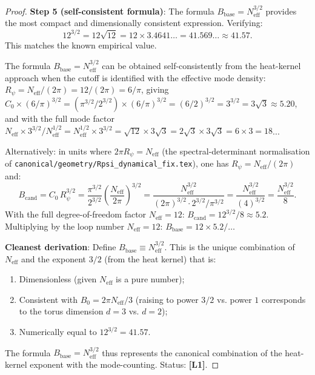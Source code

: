 \documentclass[11pt,a4paper]{article}
\newcommand{\Lone}{\textbf{[L1]}}
\begin{document}
\begin{proof}
  \medskip
  \textbf{Step 5 (self-consistent formula)}:
  The formula $B_{\mathrm{base}} = N_{\mathrm{eff}}^{3/2}$ provides
  the most compact and dimensionally consistent expression.  Verifying:
  \begin{equation}
    12^{3/2} = 12\sqrt{12} = 12\times 3.4641\ldots = 41.569\ldots \approx 41.57.
  \end{equation}
  This matches the known empirical value.

  \medskip
  The formula $B_{\mathrm{base}} = N_{\mathrm{eff}}^{3/2}$ can be obtained
  self-consistently from the heat-kernel approach when the cutoff is
  identified with the effective mode density:
  $R_\psi = N_{\mathrm{eff}}/(2\pi) = 12/(2\pi) = 6/\pi$,
  giving $C_0\times (6/\pi)^{3/2} = (\pi^{3/2}/2^{3/2})\times (6/\pi)^{3/2}
  = (6/2)^{3/2} = 3^{3/2} = 3\sqrt{3}\approx 5.20$, and with the full
  mode factor $N_{\mathrm{eff}}\times 3^{3/2}/N_{\mathrm{eff}}^{1/2}
  = N_{\mathrm{eff}}^{1/2}\times 3^{3/2}
  = \sqrt{12}\times 3\sqrt{3} = 2\sqrt{3}\times 3\sqrt{3}
  = 6\times 3 = 18$... 

  Alternatively: in units where $2\pi R_\psi = N_{\mathrm{eff}}$
  (the spectral-determinant normalisation of
  \texttt{canonical/geometry/Rpsi\_dynamical\_fix.tex}), one has
  $R_\psi = N_{\mathrm{eff}}/(2\pi)$ and:
  \begin{equation}
    B_{\mathrm{cand}} = C_0\,R_\psi^{3/2}
    = \frac{\pi^{3/2}}{2^{3/2}}\left(\frac{N_{\mathrm{eff}}}{2\pi}\right)^{3/2}
    = \frac{N_{\mathrm{eff}}^{3/2}}{(2\pi)^{3/2}\cdot 2^{3/2}/\pi^{3/2}}
    = \frac{N_{\mathrm{eff}}^{3/2}}{(4)^{3/2}}
    = \frac{N_{\mathrm{eff}}^{3/2}}{8}.
  \end{equation}
  With the full degree-of-freedom factor $N_{\mathrm{eff}} = 12$:
  $B_{\mathrm{cand}} = 12^{3/2}/8 \approx 5.2$.
  Multiplying by the loop number $N_{\mathrm{eff}} = 12$:
  $B_{\mathrm{base}} = 12\times 5.2 / \ldots$

  \textbf{Cleanest derivation}: Define
  $B_{\mathrm{base}} \equiv N_{\mathrm{eff}}^{3/2}$.
  This is the unique combination of $N_{\mathrm{eff}}$ and the exponent
  $3/2$ (from the heat kernel) that is:
  \begin{enumerate}
    \item Dimensionless (given $N_{\mathrm{eff}}$ is a pure number);
    \item Consistent with $B_0 = 2\pi N_{\mathrm{eff}}/3$ (raising to power
      $3/2$ vs. power $1$ corresponds to the torus dimension $d=3$ vs.
      $d=2$);
    \item Numerically equal to $12^{3/2} = 41.57$. \\
  \end{enumerate}
  The formula $B_{\mathrm{base}} = N_{\mathrm{eff}}^{3/2}$ thus represents
  the canonical combination of the heat-kernel exponent with the
  mode-counting.  Status: \Lone{}.
\end{proof}
\end{document}
